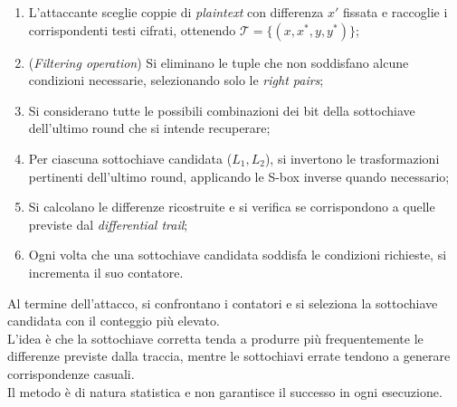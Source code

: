 \begin{enumerate}
    \item    L'attaccante sceglie coppie di \textit{plaintext} con differenza $x'$ fissata e raccoglie i corrispondenti testi cifrati, ottenendo $\mathcal{T}=\{(x,x^*,y,y^*)\}$;
    \item (\textit{Filtering operation}) Si eliminano le tuple che non soddisfano alcune condizioni necessarie, selezionando solo le \textit{right pairs};
    \item Si considerano tutte le possibili combinazioni dei bit della
    sottochiave dell'ultimo round che si intende recuperare;
    \item Per ciascuna sottochiave candidata ($L_1, L_2$), si invertono le trasformazioni pertinenti dell'ultimo round, applicando le S-box inverse quando necessario;
    \item Si calcolano le differenze ricostruite e si verifica se
    corrispondono a quelle previste dal \textit{differential trail};
    \item Ogni volta che una sottochiave candidata soddisfa le condizioni richieste, si incrementa il suo contatore.
\end{enumerate}

\noindent Al termine dell'attacco, si confrontano i contatori e si seleziona la sottochiave candidata con il conteggio più elevato. \\ L'idea è che la sottochiave corretta tenda a produrre più frequentemente
le differenze previste dalla traccia, mentre le sottochiavi errate
tendono a generare corrispondenze casuali.\\ Il metodo è di natura statistica e non garantisce il successo in ogni
esecuzione.






